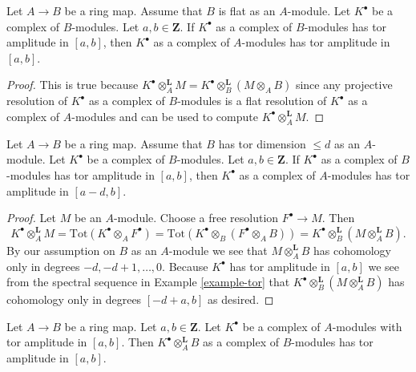 \begin{lemma}
\label{lemma-flat-push-tor-amplitude}
Let $A \to B$ be a ring map. Assume that $B$ is flat as an
$A$-module. Let $K^\bullet$ be a complex of $B$-modules.
Let $a, b \in \mathbf{Z}$. If $K^\bullet$ as a complex of $B$-modules
has tor amplitude in $[a, b]$, then $K^\bullet$ as a complex of
$A$-modules has tor amplitude in $[a, b]$.
\end{lemma}

\begin{proof}
This is true because
$K^\bullet \otimes_A^{\mathbf{L}} M =
K^\bullet \otimes_B^{\mathbf{L}} (M \otimes_A B)$
since any projective resolution of $K^\bullet$ as a complex of $B$-modules
is a flat resolution of $K^\bullet$ as a complex of $A$-modules and
can be used to compute $K^\bullet \otimes_A^{\mathbf{L}} M$.
\end{proof}

\begin{lemma}
\label{lemma-finite-tor-dimension-push-tor-amplitude}
Let $A \to B$ be a ring map. Assume that $B$ has tor dimension $\leq d$
as an $A$-module. Let $K^\bullet$ be a complex of $B$-modules.
Let $a, b \in \mathbf{Z}$. If $K^\bullet$ as a complex of $B$-modules
has tor amplitude in $[a, b]$, then $K^\bullet$ as a complex of
$A$-modules has tor amplitude in $[a - d, b]$.
\end{lemma}

\begin{proof}
Let $M$ be an $A$-module. Choose a free resolution $F^\bullet \to M$.
Then
$$
K^\bullet \otimes_A^{\mathbf{L}} M =
\text{Tot}(K^\bullet \otimes_A F^\bullet) =
\text{Tot}(K^\bullet \otimes_B (F^\bullet \otimes_A B)) =
K^\bullet \otimes_B^{\mathbf{L}} (M \otimes_A^{\mathbf{L}} B).
$$
By our assumption on $B$ as an $A$-module we see that
$M \otimes_A^{\mathbf{L}} B$ has cohomology only in degrees
$-d, -d + 1, \ldots, 0$. Because $K^\bullet$ has tor amplitude in
$[a, b]$ we see from the spectral sequence in
Example \ref{example-tor}
that $K^\bullet \otimes_B^{\mathbf{L}} (M \otimes_A^{\mathbf{L}} B)$
has cohomology only in degrees $[-d + a, b]$ as desired.
\end{proof}

\begin{lemma}
\label{lemma-pull-tor-amplitude}
Let $A \to B$ be a ring map.
Let $a, b \in \mathbf{Z}$.
Let $K^\bullet$ be a complex of $A$-modules with tor amplitude in $[a, b]$.
Then $K^\bullet \otimes_A^{\mathbf{L}} B$ as a complex of $B$-modules
has tor amplitude in $[a, b]$.
\end{lemma}

